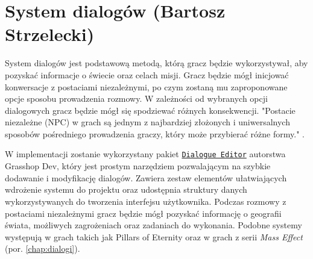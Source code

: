 \section{System dialogów (Bartosz Strzelecki)}\label{s:dial_proj}
System dialogów jest podstawową metodą, którą gracz będzie wykorzystywał, aby pozyskać informacje  o świecie oraz celach misji.
Gracz będzie mógł inicjować konwersacje z postaciami niezależnymi, po czym zostaną mu zaproponowane opcje sposobu prowadzenia rozmowy.
W zależności od wybranych opcji dialogowych gracz będzie mógł się spodziewać różnych konsekwencji.
"Postacie niezależne (NPC) w grach są jednym z najbardziej złożonych i uniwersalnych sposobów pośredniego prowadzenia graczy, który może przybierać różne formy." \cite{projektowanie_gier}.

W implementacji zostanie wykorzystany pakiet
\href{https://assetstore.unity.com/packages/tools/utilities/dialogue-editor-168329}{\texttt{Dialogue Editor}} autorstwa Grasshop Dev, który jest prostym narzędziem pozwalającym na szybkie dodawanie i modyfikację dialogów.
Zawiera zestaw elementów ułatwiających wdrożenie systemu do projektu oraz udostępnia struktury danych wykorzystywanych do tworzenia interfejsu użytkownika.
Podczas rozmowy z postaciami niezależnymi gracz będzie mógł pozyskać informację o geografii świata, możliwych zagrożeniach oraz zadaniach do wykonania. 
Podobne systemy występują w grach takich jak Pillars of Eternity oraz w grach z serii \textit{Mass Effect} (por. \ref{chap:dialogi}).

